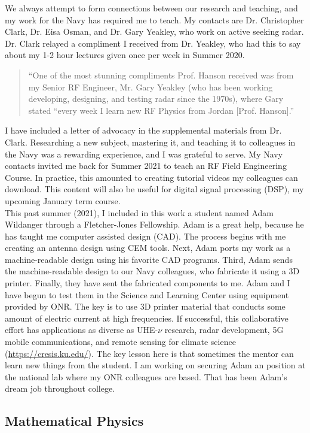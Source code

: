 \documentclass[../../../main.tex]{subfiles}
\begin{document}
We always attempt to form connections between our research and teaching, and my work for the Navy has required me to teach.  My contacts are Dr. Christopher Clark, Dr. Eisa Osman, and Dr. Gary Yeakley, who work on active seeking radar.  Dr. Clark relayed a compliment I received from Dr. Yeakley, who had this to say about my 1-2 hour lectures given once per week in Summer 2020.
\begin{quote}
``One of the most stunning compliments Prof. Hanson received was from my Senior RF Engineer, Mr. Gary Yeakley (who has been working developing, designing, and testing radar since the 1970s), where Gary stated ``every week I learn new RF Physics from Jordan [Prof. Hanson].''
\end{quote}
I have included a letter of advocacy in the supplemental materials from Dr. Clark.  Researching a new subject, mastering it, and teaching it to colleagues in the Navy was a rewarding experience, and I was grateful to serve.  My Navy contacts invited me back for Summer 2021 to teach an RF Field Engineering Course.  In practice, this amounted to creating tutorial videos my colleagues can download.  This content will also be useful for digital signal processing (DSP), my upcoming January term course.
\\
\vspace{0.25cm}
This past summer (2021), I included in this work a student named Adam Wildanger through a Fletcher-Jones Fellowship.  Adam is a great help, because he has taught me computer assisted design (CAD).  The process begins with me creating an antenna design using CEM tools.  Next, Adam ports my work as a machine-readable design using his favorite CAD programs.  Third, Adam sends the machine-readable design to our Navy colleagues, who fabricate it using a 3D printer.  Finally, they have sent the fabricated components to me.  Adam and I have begun to test them in the Science and Learning Center using equipment provided by ONR.  The key is to use 3D printer material that conducts some amount of electric current at high frequencies.  If successful, this collaborative effort has applications as diverse as UHE-$\nu$ research, radar development, 5G mobile communications, and remote sensing for climate science (\url{https://cresis.ku.edu/}).  The key lesson here is that sometimes the mentor can learn new things from the student.  I am working on securing Adam an position at the national lab where my ONR colleagues are based.  That has been Adam's dream job throughout college.

\subsection{Mathematical Physics}
\label{sec:math_phys}
\end{document}
